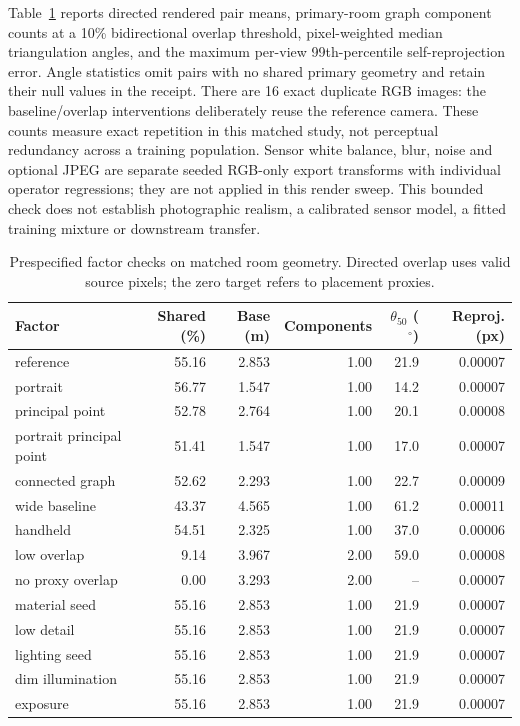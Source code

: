 Table~\ref{tab:factor-qualification} reports directed rendered pair means, primary-room graph component counts at a 10\% bidirectional overlap threshold, pixel-weighted median triangulation angles, and the maximum per-view 99th-percentile self-reprojection error. Angle statistics omit pairs with no shared primary geometry and retain their null values in the receipt. There are 16 exact duplicate RGB images: the baseline/overlap interventions deliberately reuse the reference camera. These counts measure exact repetition in this matched study, not perceptual redundancy across a training population. Sensor white balance, blur, noise and optional JPEG are separate seeded RGB-only export transforms with individual operator regressions; they are not applied in this render sweep. This bounded check does not establish photographic realism, a calibrated sensor model, a fitted training mixture or downstream transfer.

\begin{table}[htbp]\centering\small
\begin{tabular}{lrrrrr}\toprule
Factor & Shared (\%) & Base (m) & Components & $\theta_{50}$ ($^\circ$) & Reproj. (px) \\
\midrule
reference & 55.16 & 2.853 & 1.00 & 21.9 & 0.00007 \\
portrait & 56.77 & 1.547 & 1.00 & 14.2 & 0.00007 \\
principal point & 52.78 & 2.764 & 1.00 & 20.1 & 0.00008 \\
portrait principal point & 51.41 & 1.547 & 1.00 & 17.0 & 0.00007 \\
connected graph & 52.62 & 2.293 & 1.00 & 22.7 & 0.00009 \\
wide baseline & 43.37 & 4.565 & 1.00 & 61.2 & 0.00011 \\
handheld & 54.51 & 2.325 & 1.00 & 37.0 & 0.00006 \\
low overlap & 9.14 & 3.967 & 2.00 & 59.0 & 0.00008 \\
no proxy overlap & 0.00 & 3.293 & 2.00 & -- & 0.00007 \\
material seed & 55.16 & 2.853 & 1.00 & 21.9 & 0.00007 \\
low detail & 55.16 & 2.853 & 1.00 & 21.9 & 0.00007 \\
lighting seed & 55.16 & 2.853 & 1.00 & 21.9 & 0.00007 \\
dim illumination & 55.16 & 2.853 & 1.00 & 21.9 & 0.00007 \\
exposure & 55.16 & 2.853 & 1.00 & 21.9 & 0.00007 \\
\bottomrule\end{tabular}
\caption{Prespecified factor checks on matched room geometry. Directed overlap uses valid source pixels; the zero target refers to placement proxies.}\label{tab:factor-qualification}
\end{table}

